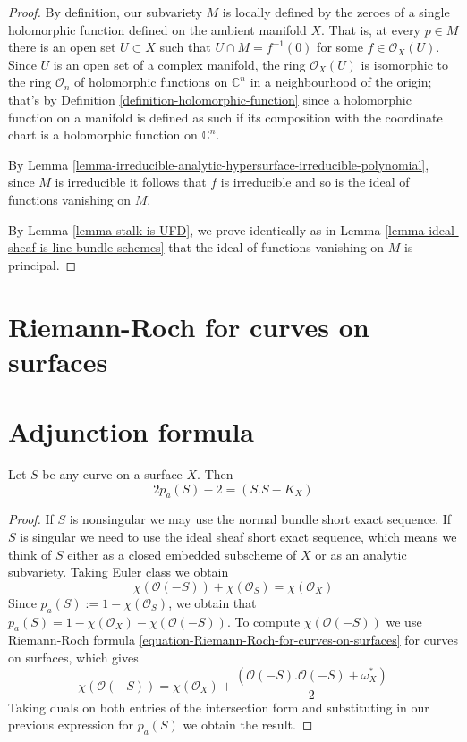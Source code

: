 \begin{proof}
By definition, our subvariety $M$ is locally defined by the zeroes of a single 
holomorphic function defined on the ambient manifold $X$. That is,
at every $p\in M$ there is an open set $U\subset X$ such that $U\cap
M=f^{-1}(0)$ for some $f\in\mathcal{O}_X(U)$. Since $U$ is an open set of a
complex manifold, the ring $\mathcal{O}_X(U)$ is isomorphic to the ring
$\mathcal{O}_n$ of holomorphic functions on $\mathbb{C}^n$ in a neighbourhood of
the origin; that's by Definition \ref{definition-holomorphic-function} since a
holomorphic function on a manifold is defined as such if its composition with
the coordinate chart is a holomorphic function on $\mathbb{C}^n$.

By Lemma
\ref{lemma-irreducible-analytic-hypersurface-irreducible-polynomial}, since $M$
is irreducible it follows that $f$ is irreducible and so is the ideal of
functions vanishing on $M$.

By Lemma \ref{lemma-stalk-is-UFD}, we prove identically as in Lemma 
\ref{lemma-ideal-sheaf-is-line-bundle-schemes} that the ideal of functions
vanishing on $M$ is principal.
\end{proof}

\section{Riemann-Roch for curves on surfaces}
\label{section-Riemann-Roch-for-curves-on-surfaces}





\section{Adjunction formula}
\label{section-adjunction-formula}

\begin{lemma}
\label{lemma-adjunction-formula-for-curves-on-surfaces}
Let $S$ be any curve on a surface $X$. Then
\begin{equation}
\label{equation-adjunction-formula-for-curves-on-surfaces}
2p_a(S)-2=(S.S-K_X)
\end{equation}
\end{lemma}

\begin{proof}
If $S$ is nonsingular we may use the normal bundle short exact sequence. If
$S$ is singular we need to use the ideal sheaf short exact sequence, which means
we think of $S$ either as a closed embedded subscheme of $X$ or as an analytic 
subvariety. Taking Euler class we obtain
$$
\chi(\mathcal{O}(-S))+\chi(\mathcal{O}_S)=\chi(\mathcal{O}_X)
$$
Since $p_a(S):=1-\chi(\mathcal{O}_S)$, we obtain that
$p_a(S)=1-\chi(\mathcal{O}_X)-\chi(\mathcal{O}(-S))$. To compute
$\chi(\mathcal{O}(-S))$ we use Riemann-Roch formula
\ref{equation-Riemann-Roch-for-curves-on-surfaces} for curves on surfaces, which
gives
$$
\chi(\mathcal{O}(-S))=\chi(\mathcal{O}_X)
+\frac{(\mathcal{O}(-S).\mathcal{O}(-S)+\omega_X^*)}{2}
$$
Taking duals on both entries of the intersection form and substituting in our
previous expression for $p_a(S)$ we obtain the result.
\end{proof}

